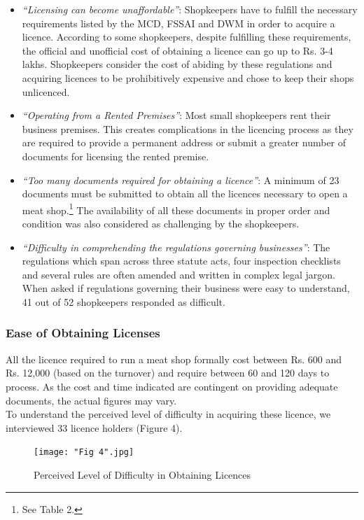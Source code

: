 \documentclass[a4paper, 12pt]{article}
\begin{document}
\begin{itemize}
\item \textit{“Licensing can become unaffordable”}: Shopkeepers have to fulfill the necessary requirements listed by the MCD, FSSAI and DWM in order to acquire a licence. According to some shopkeepers, despite fulfilling these requirements, the official and unofficial cost of obtaining a licence can go up to Rs. 3-4 lakhs. Shopkeepers consider the cost of abiding by these regulations and acquiring licences to be prohibitively expensive and chose to keep their shops unlicenced.
\item \textit{“Operating from a Rented Premises”}: Most small shopkeepers rent their business premises. This creates complications in the licencing process as they are required to provide a permanent address or submit a greater number of documents for licensing the rented premise. 
\item \textit{“Too many documents required for obtaining a licence”}: A minimum of 23 documents must be submitted to obtain all the licences necessary to open a meat shop.\footnote{ See Table 2.} The availability of all these documents in proper order and condition was also considered as challenging by the shopkeepers.
\item \textit{“Difficulty in comprehending the regulations governing businesses”}: The regulations which span across three statute acts, four inspection checklists and several rules are often amended and written in complex legal jargon. When asked if regulations governing their business were easy to understand, 41 out of 52 shopkeepers responded as difficult.
\end{itemize}

\subsubsection{Ease of Obtaining Licenses}

All the licence required to run a meat shop formally cost between Rs. 600 and Rs. 12,000 (based on the turnover) and require between 60 and 120 days to process. As the cost and time indicated are contingent on providing adequate documents, the actual figures may vary. \\

To understand the perceived level of difficulty in acquiring these licence, we interviewed 33 licence holders (Figure 4).\\

\begin{figure}[H]
\centering
\texttt{[image: "Fig 4".jpg]}
\caption[Perceived Level of Difficulty in Obtaining Licences] {Perceived Level of Difficulty in Obtaining Licences\footnotemark}
\end{figure} 
\end{document}
